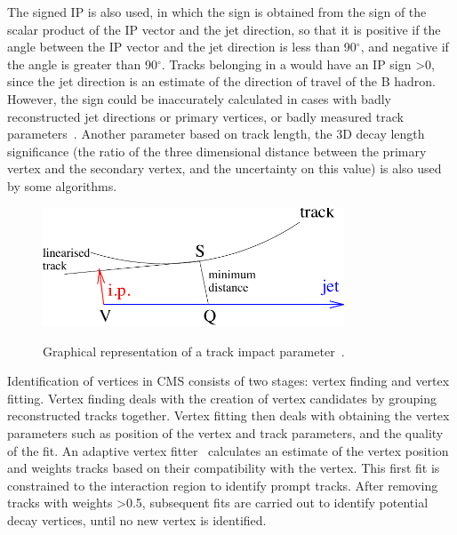 The signed IP is also used, in which the sign is obtained from the sign of the scalar product of the IP vector
and the jet direction, so that it is positive if the angle between the IP vector and the jet direction is less
than 90$^{\circ}$, and negative if the angle is greater than 90$^{\circ}$. Tracks belonging in a \bjet would
have an IP sign >0, since the jet direction is an estimate of the direction of travel of the B hadron.
However, the sign could be inaccurately calculated in cases with badly reconstructed jet directions or primary
vertices, or badly measured track parameters~\cite{CMS-AN-2005-041}. Another parameter based on track length,
the 3D decay length significance (the ratio of the three dimensional distance between the primary vertex and
the secondary vertex, and the uncertainty on this value) is also used by some \btagging algorithms.

\begin{figure}[hbtp]
   \centering
     \includegraphics[width=0.8\textwidth]{Chapters/04_Analysis/04a_BTags/Images/impact_parameter}\\
     \caption[Graphical representation of a track impact parameter.]{Graphical representation of a track
     impact parameter~\cite{CMS-PAS-BTV-09-001}.}
     \label{fig:impact_parameter}
\end{figure}

Identification of vertices in CMS consists of two stages: vertex finding and vertex fitting. Vertex finding
deals with the creation of vertex candidates by grouping reconstructed tracks together. Vertex fitting then
deals with obtaining the vertex parameters such as position of the vertex and track parameters, and the
quality of the fit. An adaptive vertex fitter~\cite{0954-3899-34-12-N01} calculates an estimate of the vertex
position and weights tracks based on their compatibility with the vertex. This first fit is constrained to the
interaction region to identify prompt tracks. After removing tracks with weights >0.5, subsequent fits are
carried out to identify potential decay vertices, until no new vertex is identified.

